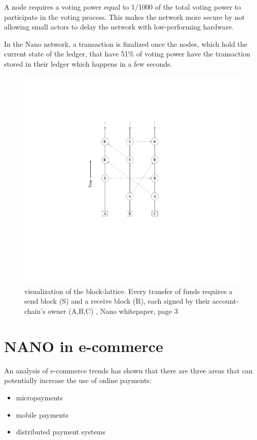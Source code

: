 \documentclass{ferseminar}
\begin{document}
A node requires a voting power equal to 1/1000 of the total voting power to participate in the voting process. This makes the network more secure by not allowing small actors to delay the network with low-performing hardware.

In the Nano network, a transaction is finalized once the nodes, which hold the current state of the ledger, that have 51\% of voting power have the transaction stored in their ledger which happens in a few seconds.

\begin{figure}[ht]
	\caption{visualization of the block-lattice. 
		Every transfer of funds requires a
		send block (S) and a receive block (R), each signed by their account-chain’s
		owner (A,B,C) \cite{Nano}, Nano whitepaper, page 3}
	\includegraphics[scale=0.55]{lattice}
	\centering
\end{figure}
\FloatBarrier

\section{NANO in e-commerce}
An analysis of e-commerce trends \cite{Lowry} has shown that there are three areas that can potentially increase the use of online payments:
\begin{itemize}
	\item micropayments
	\item mobile payments
	\item distributed payment systems
\end{itemize}
\end{document}
